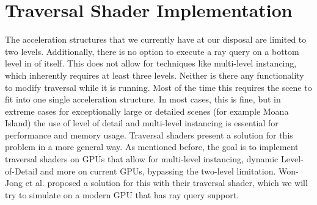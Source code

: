 \chapter{Traversal Shader Implementation}
\label{sec:ImplTraversalShader}
The acceleration structures that we currently have at our disposal are limited to two levels. Additionally, there is no option to execute a ray query on a bottom level in of itself. This does not allow for techniques like multi-level instancing, which inherently requires at least three levels. Neither is there any functionality to modify traversal while it is running. Most of the time this requires the scene to fit into one single acceleration structure. In most cases, this is fine, but in extreme cases for exceptionally large or detailed scenes (for example Moana Island) the use of level of detail and multi-level instancing is essential for performance and memory usage. Traversal shaders present a solution for this problem in a more general way. As mentioned before, the goal is to implement traversal shaders on GPUs that allow for multi-level instancing, dynamic Level-of-Detail and more on current GPUs, bypassing the two-level limitation. Won-Jong et al. \cite{traversalArticle} proposed a solution for this with their traversal shader, which we will try to simulate on a modern GPU that has ray query support.
\newpage
